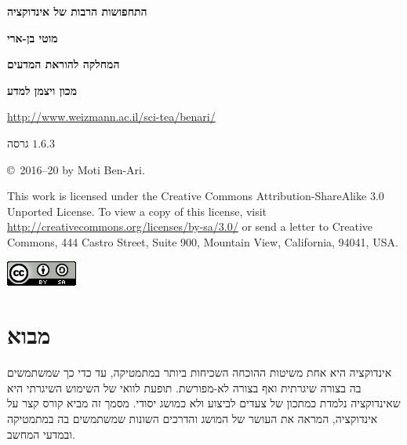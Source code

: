 
\thispagestyle{empty}

\begin{center}
\textbf{\LARGE התחפושות הרבות של אינדוקציה}

\bigskip
\bigskip

\textbf{\Large מוטי בן-ארי}

\bigskip

\textbf{\large המחלקה להוראת המדעים}

\smallskip

\textbf{\large מכון ויצמן למדע}

\bigskip

\url{http://www.weizmann.ac.il/sci-tea/benari/}

\bigskip

\large{גרסה
$1.6.3$}
\end{center}

\vfill

\begin{center}
\copyright{}\  2016--20 by Moti Ben-Ari.
\end{center}

This work is licensed under the Creative Commons Attribution-ShareAlike 3.0 Unported License. To view a copy of this license, visit \url{http://creativecommons.org/licenses/by-sa/3.0/} or send a letter to Creative Commons, 444 Castro Street, Suite 900, Mountain View, California, 94041, USA.

\begin{center}
\includegraphics[width=.2\textwidth]{../../by-sa.png}
\end{center}


\setcounter{tocdepth}{0}
\tableofcontents


\chapter[מבוא]{\vspace*{-2ex}מבוא}\label{s.intro}

\vspace*{-4ex}

אינדוקציה היא אחת משיטות ההוכחה השכיחות ביותר במתמטיקה, עד כדי כך שמשתמשים בה בצורה שיגרתית ואף בצורה לא-מפורשת. תופעת לוואי של השימוש השיגרתי היא שאינדוקציה נלמדת כמתכון של צעדים לביצוע ולא כמושג יסודי. מסמך זה מביא קורס קצר על אינדוקציה, המראה את העושר של המושג והדרכים השונות שמשתמשים בה במתמטיקה ובמדעי המחשב.

